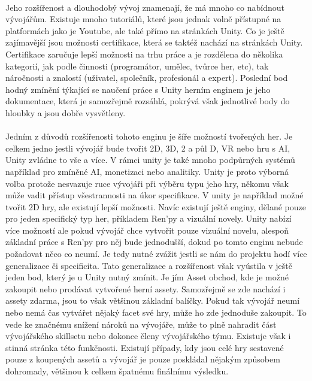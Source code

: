 \paragraph{}
	Jeho rozšířenost a dlouhodobý vývoj znamenají, že má mnoho co nabídnout vývojářům.
	Existuje mnoho tutoriálů, které jsou jednak volně přístupné na platformách jako je Youtube, ale také přímo na stránkách Unity.
	Co je ještě zajímavější jsou možnosti certifikace, která se taktéž nachází na stránkách Unity.
	Certifikace zaručuje lepší možnosti na trhu práce a je rozdělena do několika kategorií, jak podle činnosti (programátor, umělec, tvůrce her, etc), tak náročnosti a znalostí (uživatel, společník, profesionál a expert).
	Poslední bod hodný zmínění týkající se naučení práce s Unity herním enginem je jeho dokumentace\cite{unity_doc}, která je samozřejmě rozsáhlá, pokrývá však jednotlivé body do hloubky a jsou dobře vysvětleny.

\paragraph{}
	Jedním z důvodů rozšířenosti tohoto enginu je šíře možností tvořených her.
	Je celkem jedno jestli vývojář bude tvořit 2D, 3D, 2 a půl D, VR nebo hru s AI, Unity zvládne to vše a více.
	V rámci unity je také mnoho podpůrných systémů například pro zmíněné AI, monetizaci nebo analitiky.
	Unity je proto výborná volba protože nesvazuje ruce vývojáři při výběru typu jeho hry, někomu však může vadit přístup všestrannosti na úkor specifikace.
	V unity je například možné tvořit 2D hry, ale existují lepší možnosti.
	Navíc existují ještě enginy, dělané pouze pro jeden specifický typ her, příkladem Ren'py\cite{ren_py} a vizuální novely.
	Unity nabízí více možností ale pokud vývojář chce vytvořit pouze vizuální novelu, alespoň základní práce s Ren'py pro něj bude jednodušší, dokud po tomto enginu nebude požadovat něco co neumí.
	Je tedy nutné zvážit jestli se nám do projektu hodí více generalizace či specificita.
	Tato generalizace a rozšířenost však vyústila v ještě jeden bod, který je u Unity nutný zmínit.
	Je jím Asset obchod\cite{unity_asset_store}, kde je možné zakoupit nebo prodávat vytvořené herní assety.
	Samozřejmě se zde nachází i assety zdarma, jsou to však většinou základní balíčky.
	Pokud tak vývojář neumí nebo nemá čas vytvářet nějaký facet své hry, může ho zde jednoduše zakoupit.
	To vede ke značnému snížení nároků na vývojáře, může to plně nahradit část vývojářského skillsetu nebo dokonce členy vývojářského týmu.
	Existuje však i stinná stránka této funkčnosti.
	Existují případy, kdy jsou celé hry sestavené pouze z koupených assetů a vývojář je pouze poskládal nějakým způsobem dohromady, většinou k celkem špatnému finálnímu výsledku.


